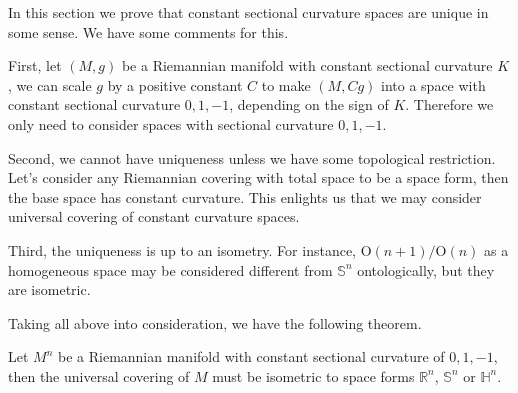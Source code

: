 In this section we prove that constant sectional curvature spaces are unique in some sense.
We have some comments for this.

First, let $(M,g)$ be a Riemannian manifold with constant sectional curvature $K$, we can scale $g$ by a positive constant $C$ to make $(M,Cg)$ into a space with constant sectional curvature $0,1,-1$, depending on the sign of $K$.
Therefore we only need to consider spaces with sectional curvature $0,1,-1$.

Second, we cannot have uniqueness unless we have some topological restriction.
Let's consider any Riemannian covering with total space to be a space form, then the base space has constant curvature.
This enlights us that we may consider universal covering of constant curvature spaces.

Third, the uniqueness is up to an isometry.
For instance, $\mathrm{O}(n+1)/\mathrm{O}(n)$ as a homogeneous space may be considered different from $\mathbb{S}^n$ ontologically, but they are isometric.

Taking all above into consideration, we have the following theorem.
\begin{thm}
    Let $M^n$ be a Riemannian manifold with constant sectional curvature of $0,1,-1$, then the universal covering of $M$ must be isometric to space forms $\mathbb{R}^n$, $\mathbb{S}^n$ or $\mathbb{H}^n$.
\end{thm}